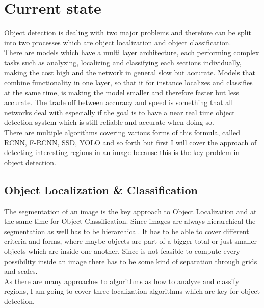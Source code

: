 \section{Current state}
Object detection is dealing with two major problems and therefore can be split into two processes which are object localization and object
classification.  \\
There are models which have a multi layer architecture, each performing complex tasks such as analyzing, localizing and classifying each
sections individually, making the cost high and the network in general slow but accurate.
Models that combine functionality in one layer, so that it for instance localizes and classifies at the same time, is making the
model smaller and therefore faster but less accurate.
The trade off between accuracy and speed is something that all networks deal with especially if the goal is to have a near real time object
detection system which is still reliable and accurate when doing so. \\
There are multiple algorithms covering various forms of this formula, called RCNN, F-RCNN, SSD, YOLO and so forth but first I will cover
the approach of detecting interesting regions in an image because this is the key problem in object detection.

\subsection{Object Localization \& Classification}
The segmentation of an image is the key approach to Object Localization and at the same time for Object Classification. Since images are always hierarchical the segmentation as well has
to be hierarchical. It has to be able to cover different criteria and forms, where maybe objects are part of a bigger total or just  smaller
objects which are inside one another. Since is not feasible to compute every possibility inside an image there has to be some kind of
separation through grids and scales. \\
As there are many approaches to algorithms as how to analyze and classify regions, I am going to cover three localization algorithms which
are key for object detection.

